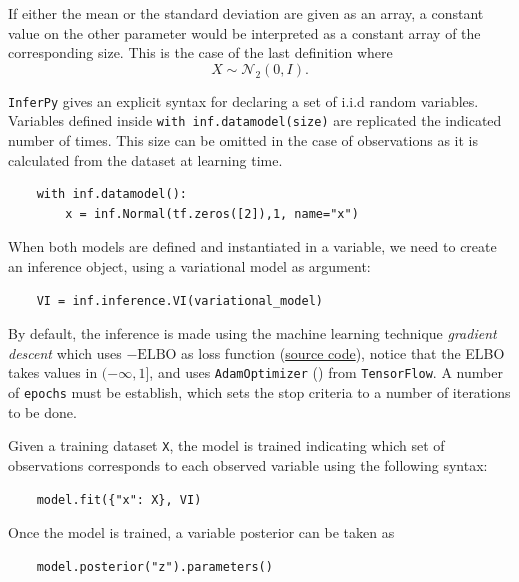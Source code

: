 If either the mean or the standard deviation are given as an array, a constant value on the other parameter would be interpreted as a constant array of the corresponding size. This is the case of the last definition where
\[
  X \sim \mathcal{N}_{2}(0,I).
\]

\texttt{InferPy} gives an explicit syntax for declaring a set of i.i.d random variables. Variables defined inside \texttt{with inf.datamodel(size)} are replicated the indicated number of times. This size can be omitted in the case of observations as it is calculated from the dataset at learning time.
\begin{verbatim}
    with inf.datamodel():
        x = inf.Normal(tf.zeros([2]),1, name="x")
\end{verbatim}

When both models are defined and instantiated in a variable, we need to create an inference object, using a variational model as argument:
\begin{verbatim}
    VI = inf.inference.VI(variational_model)
\end{verbatim}

By default, the inference is made using the machine learning technique \emph{gradient descent} which uses \(-\text{ELBO}\) as loss function (\href{https://github.com/PGM-Lab/InferPy/blob/master/inferpy/inference/variational/loss_functions/elbo.py}{source code}), notice that the ELBO takes values in \((-\infty, 1]\),  and uses \texttt{AdamOptimizer} (\cite{kingma2014adam}) from \texttt{TensorFlow}. A number of \texttt{epochs} must be establish, which sets the stop criteria to a number of iterations to be done.

Given a training dataset \texttt{X}, the model is trained indicating which set of observations corresponds to each observed variable using the following syntax:
\begin{verbatim}
    model.fit({"x": X}, VI)
\end{verbatim}
Once the model is trained, a variable posterior can be taken as
\begin{verbatim}
    model.posterior("z").parameters()
\end{verbatim}

